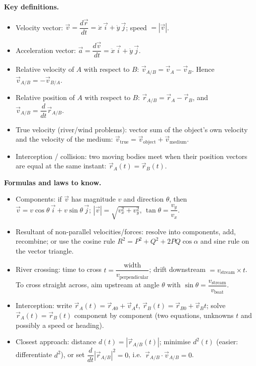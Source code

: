 \documentclass[11pt]{article}
\newcommand{\cle}[1]{{\popxbold\color{popdark}#1}}
\begin{document}
\begin{bilan}
\textbf{Key definitions.}
\begin{itemize}
\item \cle{Velocity vector}: $\vec{v}=\dfrac{d\vec{r}}{dt}=\dot{x}\,\vec{i}+\dot{y}\,\vec{j}$; speed $=|\vec{v}|$.
\item \cle{Acceleration vector}: $\vec{a}=\dfrac{d\vec{v}}{dt}=\ddot{x}\,\vec{i}+\ddot{y}\,\vec{j}$.
\item \cle{Relative velocity} of $A$ with respect to $B$: $\vec{v}_{A/B}=\vec{v}_A-\vec{v}_B$. Hence $\vec{v}_{A/B}=-\vec{v}_{B/A}$.
\item \cle{Relative position} of $A$ with respect to $B$: $\vec{r}_{A/B}=\vec{r}_A-\vec{r}_B$, and $\vec{v}_{A/B}=\dfrac{d}{dt}\vec{r}_{A/B}$.
\item \cle{True velocity} (river/wind problems): vector sum of the object's own velocity and the velocity of the medium: $\vec{v}_{\text{true}}=\vec{v}_{\text{object}}+\vec{v}_{\text{medium}}$.
\item \cle{Interception / collision}: two moving bodies meet when their position vectors are equal at the same instant: $\vec{r}_A(t)=\vec{r}_B(t)$.
\end{itemize}

\textbf{Formulas and laws to know.}
\begin{itemize}
\item Components: if $\vec{v}$ has magnitude $v$ and direction $\theta$, then $\vec{v}=v\cos\theta\,\vec{i}+v\sin\theta\,\vec{j}$; $|\vec{v}|=\sqrt{v_x^2+v_y^2}$, $\tan\theta=\dfrac{v_y}{v_x}$.
\item Resultant of non-parallel velocities/forces: resolve into components, add, recombine; or use the cosine rule $R^2=P^2+Q^2+2PQ\cos\alpha$ and sine rule on the vector triangle.
\item River crossing: time to cross $t=\dfrac{\text{width}}{v_{\text{perpendicular}}}$; drift downstream $=v_{\text{stream}}\times t$. To cross straight across, aim upstream at angle $\theta$ with $\sin\theta=\dfrac{v_{\text{stream}}}{v_{\text{boat}}}$.
\item Interception: write $\vec{r}_A(t)=\vec{r}_{A0}+\vec{v}_A t$, $\vec{r}_B(t)=\vec{r}_{B0}+\vec{v}_B t$; solve $\vec{r}_A(t)=\vec{r}_B(t)$ component by component (two equations, unknowns $t$ and possibly a speed or heading).
\item Closest approach: distance $d(t)=|\vec{r}_{A/B}(t)|$; minimise $d^2(t)$ (easier: differentiate $d^2$), or set $\dfrac{d}{dt}|\vec{r}_{A/B}|^2=0$, i.e.\ $\vec{r}_{A/B}\cdot\vec{v}_{A/B}=0$.
\end{itemize}


\end{bilan}
\end{document}
